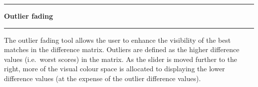 \noindent\rule{\textwidth}{1pt}
\indent \textbf{Outlier fading}
\noindent\rule{\textwidth}{1pt}
\smallskip
\parbox{\textwidth}{The outlier fading tool allows the user to enhance the visibility of the best matches in the difference matrix. Outliers are defined as the higher difference values (i.e.\ worst scores) in the matrix. As the slider is moved further to the right, more of the visual colour space is allocated to displaying the lower difference values (at the expense of the outlier difference values).}
\smallskip
